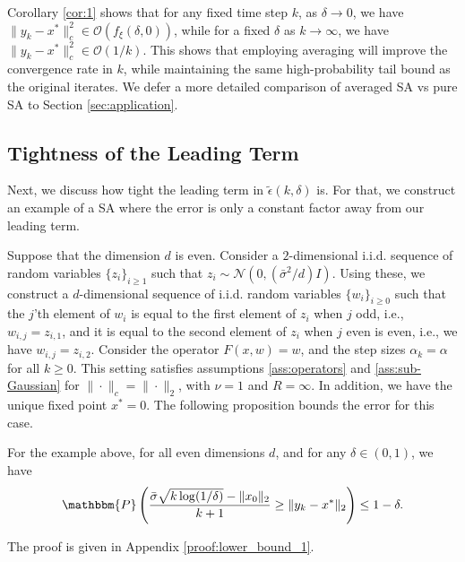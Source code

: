 \documentclass[letterpaper, 10 pt]{article}
\newcommand{\Prob}{\mathbbm{P}}
\begin{document}
Corollary \ref{cor:1} shows that for any fixed time step $k$, as $\delta\rightarrow 0$, we have $\|y_k-x^*\|_c^2\in\mathcal{O}(f_\xi(\delta,0))$, while for a fixed $\delta$ as $k\rightarrow\infty$, we have $\|y_k-x^*\|_c^2\in\mathcal{O}\left(1/k\right)$. This shows that employing averaging will improve the convergence rate in $k$, while maintaining the same high-probability tail bound as the original iterates. We defer a more detailed comparison of averaged SA vs pure SA to Section \ref{sec:application}.




\subsection{Tightness of the Leading Term}

Next, we discuss how tight the leading term in $\tilde{\epsilon}(k,\delta)$ is. For that, we construct an example of a SA where the error is only a constant factor away from our leading term.

\smallskip

Suppose that the dimension $d$ is even. Consider a $2$-dimensional i.i.d. sequence of random variables $\{z_i\}_{i\geq1}$ such that $z_i\sim\mathcal{N}(0,(\bar{\sigma}^2/d)I)$. Using these, we construct a $d$-dimensional sequence of i.i.d. random variables $\{w_i\}_{i\geq 0}$ such that the $j$'th element of $w_i$ is equal to the first element of $z_i$ when $j$ odd, i.e., $w_{i,j}=z_{i,1}$, and it is equal to the second element of $z_i$ when $j$ even is even, i.e., we have $w_{i,j}=z_{i,2}$. Consider the operator $F(x,w)=w$, and the step sizes $\alpha_k=\alpha$ for all $k\geq 0$. This setting satisfies assumptions \ref{ass:operators} and \ref{ass:sub-Gaussian} for $\|\cdot\|_c=\|\cdot\|_2$, with $\nu=1$ and $R=\infty$. In addition, we have the unique fixed point $x^*=0$. The following proposition bounds the error for this case.

\begin{proposition}\label{prop:lower_bound_1}
    For the example above, for all even dimensions $d$, and for any $\delta\in(0,1)$, we have
    \begin{align*}
        \Prob\left( \frac{\bar{\sigma}\sqrt{k \log(1/\delta)} - \|x_0\|_2}{k+1}\geq \|y_k-x^*\|_2\right)\leq  1- \delta.
    \end{align*}
\end{proposition}
The proof is given in Appendix \ref{proof:lower_bound_1}.\\
\end{document}
